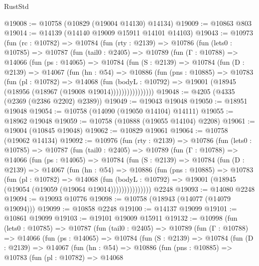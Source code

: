 \begin{lexlean}{RustStd}
\begin{coremodule}
@19008 := @10758 (@10829 (@19004 @14130) @14134)
@19009 := @10863 @803
@19014 := @14139 (@14140 @19009 @15911 @14101 @14103)
@19043 := @10973
    (fun (rc : @10782) =>
    @10784
      (fun (rty : @2139) =>
      @10786
        (fun (lets0 : @10785) =>
        @10787
          (fun (tail0 : @2405) =>
          @10789
            (fun (Γ : @10788) =>
            @14066
              (fun (ps : @14065) =>
              @10784
                (fun (S : @2139) =>
                @10784
                  (fun (D : @2139) =>
                  @14067
                    (fun (hn : @54) =>
                    @10886
                      (fun (pns : @10885) =>
                      @10783
                        (fun (pl : @10782) =>
                        @14068
                          (fun (bodyL : @10792) =>
                          @19001 (@18945 (@18956 (@18967 (@19008 @19014))))))))))))))))
@19048 := @4205 (@4335 (@2369 (@2386 @2202) @2389))
@19049 := @19043 @19048
@19050 := @18951 @19048
@19054 := @10758 (@14090 (@19050 @14104) @14111)
@19055 := @18962 @19048
@19059 := @10758 (@10888 (@19055 @14104) @2208)
@19061 := @19004 (@10845 @19048)
@19062 := @10829 @19061
@19064 := @10758 (@19062 @14134)
@19092 := @10976
    (fun (rty : @2139) =>
    @10786
      (fun (lets0 : @10785) =>
      @10787
        (fun (tail0 : @2405) =>
        @10789
          (fun (Γ : @10788) =>
          @14066
            (fun (ps : @14065) =>
            @10784
              (fun (S : @2139) =>
              @10784
                (fun (D : @2139) =>
                @14067
                  (fun (hn : @54) =>
                  @10886
                    (fun (pns : @10885) =>
                    @10783
                      (fun (pl : @10782) =>
                      @14068
                        (fun (bodyL : @10792) =>
                        @19001 (@18945 (@19054 (@19059 (@19064 @19014)))))))))))))))
    @2248
@19093 := @14080 @2248
@19094 := @19093 @10776
@19098 := @10758 (@18943 (@14077 (@14079 @19094)))
@19099 := @10858 @2248
@19100 := @14137 @19099
@19101 := @10861 @19099
@19103 := @19101 @19009 @15911
@19132 := @10998
    (fun (lets0 : @10785) =>
    @10787
      (fun (tail0 : @2405) =>
      @10789
        (fun (Γ : @10788) =>
        @14066
          (fun (ps : @14065) =>
          @10784
            (fun (S : @2139) =>
            @10784
              (fun (D : @2139) =>
              @14067
                (fun (hn : @54) =>
                @10886
                  (fun (pns : @10885) =>
                  @10783
                    (fun (pl : @10782) =>
                    @14068

\end{coremodule}
\end{lexlean}
